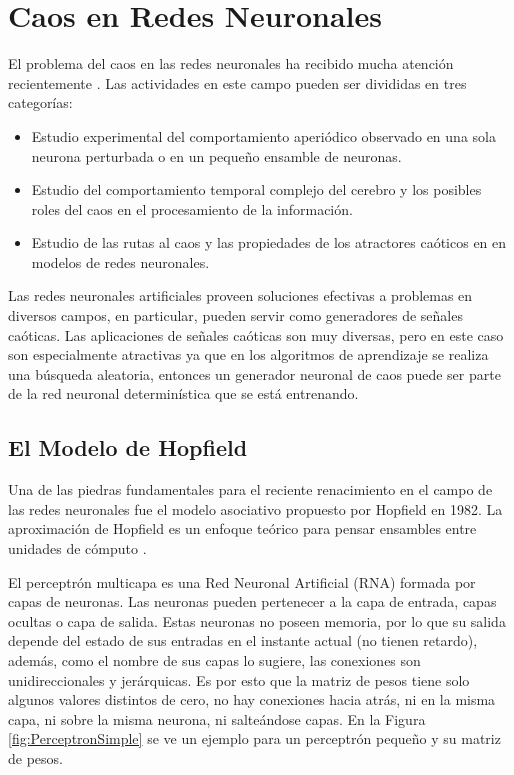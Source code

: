 \section{Caos en Redes Neuronales}
\label{sec:RNA}

El problema del caos en las redes neuronales ha recibido mucha atención recientemente \cite{Yang2003}.
Las actividades en este campo pueden ser divididas en tres categorías:
\begin{itemize}
	\item Estudio experimental del comportamiento aperiódico observado en una sola neurona perturbada o en un pequeño ensamble de neuronas.
	\item Estudio del comportamiento temporal complejo del cerebro y los posibles	roles del caos en el procesamiento de la información.
	\item Estudio de las rutas al caos y las propiedades de los atractores caóticos en en modelos de redes neuronales.
\end{itemize}

Las redes neuronales artificiales proveen soluciones efectivas a problemas en diversos campos, en particular, pueden servir como generadores de señales caóticas.
Las aplicaciones de señales caóticas son muy diversas, pero en este caso son especialmente atractivas ya que en los algoritmos de aprendizaje se realiza una búsqueda aleatoria, entonces un generador neuronal de caos puede ser parte de la red neuronal determinística que se está entrenando.

\subsection{El Modelo de Hopfield}

Una de las piedras fundamentales para el reciente renacimiento en el campo de las redes neuronales fue el modelo asociativo propuesto por Hopfield en 1982.
La aproximación de Hopfield es un enfoque teórico para pensar ensambles entre unidades de cómputo \cite{Weise2009}.

El perceptrón multicapa es una Red Neuronal Artificial (RNA) formada por capas de neuronas.
Las neuronas pueden pertenecer a la capa de entrada, capas ocultas o capa de salida.
Estas neuronas no poseen memoria, por lo que su salida depende del estado de sus entradas en el instante actual (no tienen retardo), además, como el nombre de sus capas lo sugiere, las conexiones son unidireccionales y jerárquicas.
Es por esto que la matriz de pesos tiene solo algunos valores distintos de cero, no hay conexiones hacia atrás, ni en la misma capa, ni sobre la misma neurona, ni salteándose capas.
En la Figura \ref{fig:PerceptronSimple} se ve un ejemplo para un perceptrón pequeño y su matriz de pesos.

